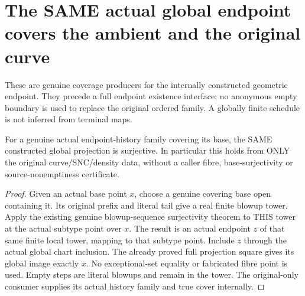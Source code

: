 \section{The SAME actual global endpoint covers the ambient and the original curve}

These are genuine coverage producers for the internally constructed
geometric endpoint. They precede a full endpoint existence interface;
no anonymous empty boundary is used to replace the original ordered
family. A globally finite schedule is not inferred from terminal maps.

\begin{theorem}
\label{hir:sharp-actual-global-projection-surjective}
\leanok
For a genuine actual endpoint-history family covering its base, the
SAME constructed global projection is surjective. In particular this
holds from ONLY the original curve/SNC/density data, without a caller
fibre, base-surjectivity or source-nonemptiness certificate.
\end{theorem}
\begin{proof}
Given an actual base point $x$, choose a genuine covering base open
containing it. Its original prefix and literal tail give a real finite
blowup tower. Apply the existing genuine blowup-sequence surjectivity
theorem to THIS tower at the actual subtype point over $x$. The result
is an actual endpoint $z$ of that same finite local tower, mapping to
that subtype point. Include $z$ through the actual global chart
inclusion. The already proved full projection square gives its global
image exactly $x$. No exceptional-set equality or fabricated fibre
point is used. Empty steps are literal blowups and remain in the tower.
The original-only consumer supplies its actual history family and true
cover internally.
\end{proof}

